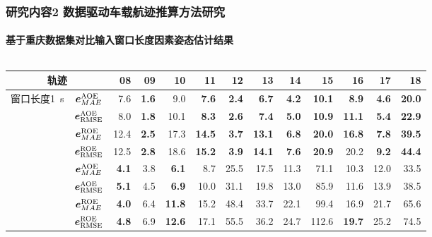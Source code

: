 \begin{frame} 
 	\frametitle{研究内容2 数据驱动车载航迹推算方法研究}
 	\framesubtitle{基于重庆数据集对比输入窗口长度因素姿态估计结果}
	\vspace{-0.2cm}
	\begin{columns}[t]
		\begin{column}{0.6\textwidth}
			{   
				\tiny   
				\setlength{\tabcolsep}{2pt}     
				\begin{tabular*}{\linewidth}{@{\extracolsep{\fill}}ccrrrrrrrrrrr}
					\toprule
					\multicolumn{2}{c}{轨迹} & 08 & 09 & 10 & 11 & 12 & 13 & 14 & 15 & 16 & 17 & 18 \\
					\midrule
					\multirow{4}{*}{窗口长度\SI{1}{\second}} 
					& $\vb*{e}^{\mathrm{AOE}}_{MAE}$ & 7.6 & \textbf{1.6} & 9.0 & \textbf{7.6} & \textbf{2.4} & \textbf{6.7} & \textbf{4.2} & \textbf{10.1} & \textbf{8.9} & \textbf{4.6} & \textbf{20.0} \\
					& $\vb*{e}^{\mathrm{AOE}}_{\mathrm{RMSE}}$ & 8.0 & \textbf{1.8} & 10.1 & \textbf{8.3} & \textbf{2.6} & \textbf{7.4} & \textbf{5.0} & \textbf{10.9} & \textbf{11.1} & \textbf{5.4} & \textbf{22.9} \\
					& $\vb*{e}^{\mathrm{ROE}}_{MAE}$ & 12.4 & \textbf{2.5} & 17.3 & \textbf{14.5} & \textbf{3.7} & \textbf{13.1} & \textbf{6.8} & \textbf{20.0} & \textbf{16.8} & \textbf{7.8} & \textbf{39.5} \\
					& $\vb*{e}^{\mathrm{ROE}}_{\mathrm{RMSE}}$ & 12.5 & \textbf{2.8} & 18.6 & \textbf{15.2} & \textbf{3.9} & \textbf{14.1} & \textbf{7.6} & \textbf{20.9} & 20.2 & \textbf{9.2} & \textbf{44.4} \\ \addlinespace[1mm]
					\multirow{4}{*}{窗口长度\SI{2}{\second}}
					& $\vb*{e}^{\mathrm{AOE}}_{MAE}$ & \textbf{4.1} & 3.8 & \textbf{6.1} & 8.7 & 25.5 & 17.5 & 11.3 & 71.1 & 10.3 & 12.0 & 33.5 \\
					& $\vb*{e}^{\mathrm{AOE}}_{\mathrm{RMSE}}$ & \textbf{5.1} & 4.5 & \textbf{6.9} & 10.0 & 31.1 & 19.8 & 13.0 & 85.9 & 11.6 & 13.9 & 38.5 \\
					& $\vb*{e}^{\mathrm{ROE}}_{MAE}$ & \textbf{4.0} & 6.4 & \textbf{11.8} & 15.2 & 48.4 & 33.7 & 22.1 & 99.4 & 16.9 & 21.7 & 65.6 \\
					& $\vb*{e}^{\mathrm{ROE}}_{\mathrm{RMSE}}$ & \textbf{4.8} & 6.9 & \textbf{12.6} & 17.1 & 55.5 & 36.2 & 24.7 & 112.6 & \textbf{19.7} & 25.2 & 74.5 \\
					\bottomrule 
				\end{tabular*}    
		   	}
			\begin{itemize}

\end{itemize}
\end{column}
\end{columns}
\end{frame}
